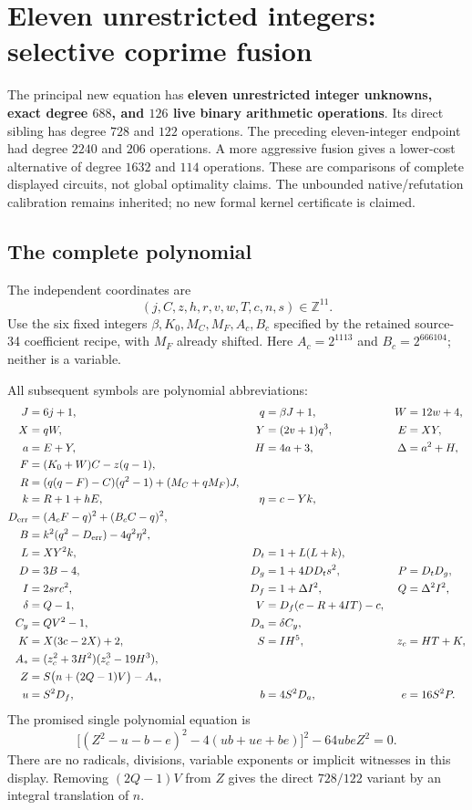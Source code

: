 \section{Eleven unrestricted integers: selective coprime fusion}
\label{sec:integer-fusion}

The principal new equation has \textbf{eleven unrestricted integer unknowns,
exact degree $688$, and $126$ live binary arithmetic operations}.
Its direct sibling has degree $728$ and $122$ operations.
The preceding eleven-integer endpoint had degree $2240$ and $206$ operations.
A more aggressive fusion gives a lower-cost alternative of degree $1632$
and $114$ operations. These are comparisons of complete displayed
circuits, not global optimality claims. The unbounded native/refutation
calibration remains inherited; no new formal kernel certificate is claimed.

\subsection{The complete polynomial}
The independent coordinates are
\[
 (j,C,z,h,r,v,w,T,c,n,s)\in\mathbb Z^{11}.
\]
Use the six fixed integers $\beta,K_0,M_C,M_F,A_c,B_c$ specified by the
retained source-34 coefficient recipe, with $M_F$ already shifted.
Here $A_c=2^{1113}$ and $B_c=2^{666104}$; neither is a variable.

All subsequent symbols are polynomial abbreviations:
\begin{align*}
 J&=6j+1,&q&=\beta J+1,& W&=12w+4,\\
 X&=qW,&Y&=(2v+1)q^3,& E&=XY,\\
 a&=E+Y,& H&=4a+3,&\Delta&=a^2+H,\\
 F&=(K_0+W)C-z(q-1),\\
 R&=(q(q-F)-C)(q^2-1)+(M_C+qM_F)J,\\
 k&=R+1+hE,&\eta&=c-Yk,\\
 D_{\rm err}&=(A_cF-q)^2+(B_cC-q)^2,\\
 B&=k^2(q^2-D_{\rm err})-4q^2\eta^2,\\
 L&=XY^2k,&D_t&=1+L(L+k),\\
 D&=3B-4,&D_g&=1+4DD_t s^2,&P&=D_tD_g,\\
 I&=2src^2,&D_f&=1+\Delta I^2,&Q&=\Delta^2I^2,\\
 \delta&=Q-1,&V&=D_f(c-R+4IT)-c,\\
 C_y&=QV^2-1,&D_a&=\delta C_y,\\
 K&=X(3c-2X)+2,&S&=IH^5,&z_c&=HT+K,\\
 A_*&=(z_c^2+3H^2)(z_c^3-19H^3),\\
 Z&=S\bigl(n+(2Q-1)V\bigr)-A_*,\\
 u&=S^2D_f,&b&=4S^2D_a,&e&=16S^2P.
\end{align*}
The promised single polynomial equation is
\begin{equation}\label{eq:integer-fusion}
 \boxed{\ \bigl[(Z^2-u-b-e)^2-4(ub+ue+be)\bigr]^2
                 -64ubeZ^2=0.\ }
\end{equation}
There are no radicals, divisions, variable exponents or implicit witnesses
in this display. Removing $(2Q-1)V$ from $Z$ gives the direct $728/122$
variant by an integral translation of $n$.

